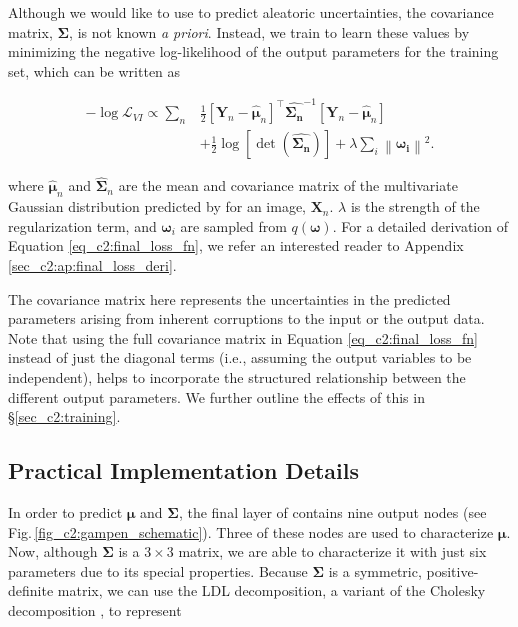 Although we would like to use \gampen{} to predict aleatoric uncertainties, the covariance matrix, $\boldsymbol{\Sigma}$, is not known {\it a priori}. Instead, we train \gampen{} to learn these values by minimizing the negative log-likelihood of the output parameters for the training set, which can be written as

\begin{equation}
\begin{split}
- \log \mathcal{L}_{VI} \propto  \sum_{n} & \frac{1}{2}\left[\boldsymbol{Y}_{n}-\boldsymbol{\hat{\mu}}_{n}\right]^{\top} \boldsymbol{\hat{\Sigma_n}}^{-1}\left[\boldsymbol{Y}_{n}-\boldsymbol{\hat{\mu}}_{n}\right] \\ 
& + \frac{1}{2} \log [\operatorname{det}(\boldsymbol{\hat{\Sigma_n}})] + \lambda \sum_{i}\left\|\boldsymbol{\omega_{i}}\right\|^{2} .
\end{split}
\label{eq_c2:final_loss_fn}
\end{equation}

where $\boldsymbol{\hat{\mu}}_n$ and $\boldsymbol{\hat{\Sigma}}_n$ are the mean and covariance matrix of the multivariate Gaussian distribution predicted by \gampen{} for an image, $\boldsymbol{X}_n$. $\lambda$ is the strength of the regularization term, and $\boldsymbol{\omega}_i$ are sampled from $q(\boldsymbol{\omega})$. For a detailed derivation of Equation \ref{eq_c2:final_loss_fn}, we refer an interested reader to Appendix \ref{sec_c2:ap:final_loss_deri}.

The covariance matrix here represents the uncertainties in the predicted parameters arising from inherent corruptions to the input or the output data. Note that using the full covariance matrix in Equation \ref{eq_c2:final_loss_fn} instead of just the diagonal terms (i.e., assuming the output variables to be independent), helps \gampen{} to incorporate the structured relationship between the different output parameters. We further outline the effects of this in \S \ref{sec_c2:training}.


\subsection{Practical Implementation Details} \label{subsec_c2:uncertainty_implementation}

In order to predict $\boldsymbol{\mu}$ and $\boldsymbol{\Sigma}$, the final layer of \gampen{} contains nine output nodes (see Fig.\,\ref{fig_c2:gampen_schematic}). Three of these nodes are used to characterize $\boldsymbol{\mu}$. %
Now, although $\boldsymbol{\Sigma}$ is a $3\times3$ matrix, we are able to characterize it with just six parameters due to its special properties. Because $\boldsymbol{\Sigma}$ is a symmetric, positive-definite matrix, we can use the LDL decomposition, a variant of the Cholesky decomposition \citep{cholesky}, to represent 

